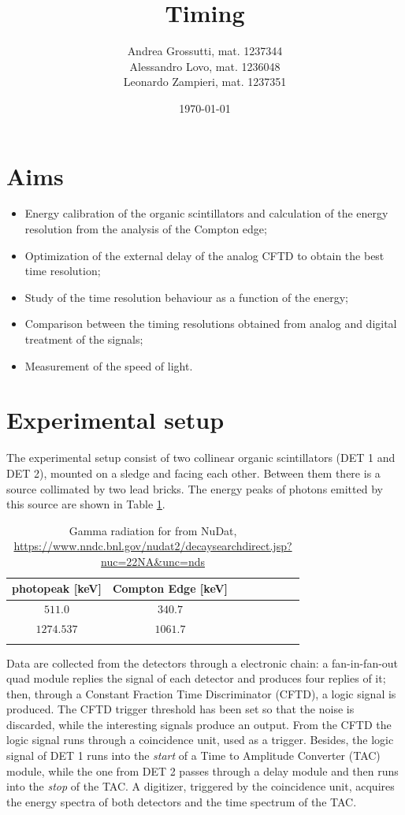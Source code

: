 \documentclass[11pt,a4 paper]{article}
\title{Timing}
\author{Andrea Grossutti, mat. 1237344\\Alessandro Lovo, mat. 1236048\\Leonardo Zampieri, mat. 1237351}
\date{\today}
\begin{document}
\maketitle

\section{Aims}
\begin{itemize}[noitemsep]
    \item Energy calibration of the organic scintillators and calculation of the energy resolution from the analysis of the Compton edge;
    \item Optimization of the external delay of the analog CFTD to obtain the best time resolution;
    \item Study of the time resolution behaviour as a function of the energy;
    \item Comparison between the timing resolutions obtained from analog and digital treatment of the signals;
    \item Measurement of the speed of light.
\end{itemize}

\section{Experimental setup}
The experimental setup consist of two collinear organic scintillators (DET 1 and DET 2), mounted on a sledge and facing each other. Between them there is a  source collimated by two lead bricks. The energy peaks of photons emitted by this source are shown in Table \ref{tab:gammavalue}.

\begin{table}[H]
    \centering
    \begin{tabular}{cccccccc}
        \toprule
        photopeak [keV] & Compton Edge [keV] \\
        \midrule
        $511.0$ & $340.7$\\
        $1274.537$ & $1061.7$ \\
        \bottomrule\vspace{0.01cm}
    \end{tabular}
    \caption{Gamma radiation for  from NuDat, \url{https://www.nndc.bnl.gov/nudat2/decaysearchdirect.jsp?nuc=22NA\&unc=nds}}
    \label{tab:gammavalue}
\end{table}

Data are collected from the detectors through a electronic chain: a fan-in-fan-out quad module replies the signal of each detector and produces four replies of it; then, through a Constant Fraction Time Discriminator (CFTD), a logic signal is produced. The CFTD trigger threshold has been set so that the noise is discarded, while the interesting signals produce an output. From the CFTD the logic signal runs through a coincidence unit, used as a trigger. Besides, the logic signal of DET 1 runs into the \emph{start} of a Time to Amplitude Converter (TAC) module, while the one from DET 2 passes through a delay module and then runs into the \emph{stop} of the TAC. A digitizer, triggered by the coincidence unit, acquires the energy spectra of both detectors and the time spectrum of the TAC.
\end{document}
